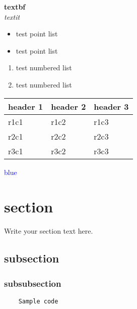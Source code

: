\documentclass{article}
\begin{document}
\error

\textbf{textbf}\\
\textit{textit}\\

\begin{itemize}
    \item test point list
    \item test point list
\end{itemize}

\begin{enumerate}
    \item test numbered list
    \item test numbered list
\end{enumerate}

\begin{table}[]
\begin{tabular}{lll}
header 1 & header 2 & header 3 \\\hline
r1c1     & r1c2     & r1c3\\
r2c1     & r2c2     & r2c3\\
r3c1     & r3c2     & r3c3
\end{tabular}
\end{table}

\textcolor{blue}{blue}

\section{section}
Write your section text here.
\subsection{subsection}
\subsubsection{subsubsection}

\begin{verbatim}
    Sample code
\end{verbatim}

\end{document}
